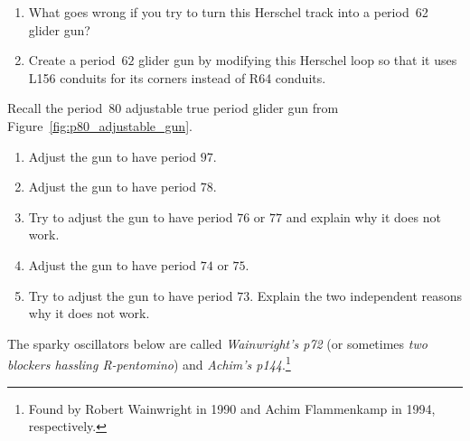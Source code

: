 \begin{multicols}{2}
\begin{problem}
\begin{enumerate}[label=\bf\color{ocre}(\alph*)]
			\item {} What goes wrong if you try to turn this Herschel track into a period~62 glider gun? %
			
			\item {} Create a period~$62$ glider gun by modifying this Herschel loop so that it uses L156 conduits for its corners instead of R64 conduits.
		\end{enumerate}
	\end{problem}
	
	
	\mfilbreak
	
	
	\begin{problem}\label{exer:p80_adjustable_manipulate}
		Recall the period~$80$ adjustable true period glider gun from Figure~\ref{fig:p80_adjustable_gun}.\smallskip
		
		\begin{enumerate}[label=\bf\color{ocre}(\alph*)]
			\item Adjust the gun to have period $97$.
			
			\item Adjust the gun to have period $78$.
			
			\item Try to adjust the gun to have period $76$ or $77$ and explain why it does not work.
			
			\item Adjust the gun to have period $74$ or $75$.
			
			\item Try to adjust the gun to have period $73$. Explain the two independent reasons why it does not work.
		\end{enumerate}
	\end{problem}
	
	
	\mfilbreak
	
	
	\begin{problem}\label{exer:p144_gun_from_achim}
		The sparky oscillators below are called \emph{Wainwright's p72} (or sometimes \emph{two blockers hassling R-pentomino}) and \emph{Achim's p144}.\footnote{Found by Robert Wainwright in 1990 and Achim Flammenkamp in 1994, respectively.}
		\begin{center}
			 \quad {}
		\end{center}
		

\end{problem}
\end{multicols}
